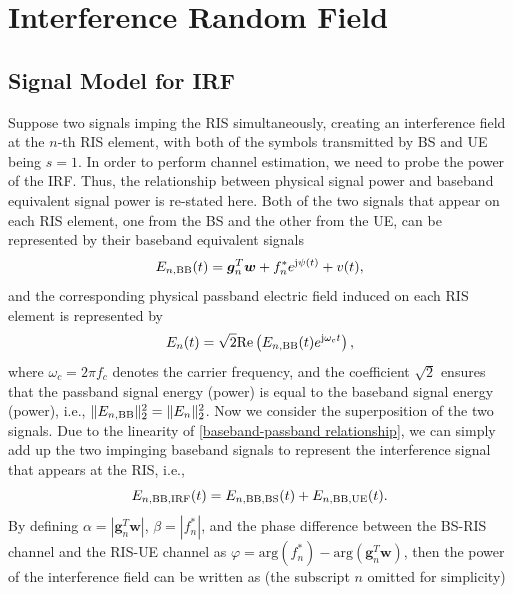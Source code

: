 \documentclass[12pt,draftclsnofoot,journal,onecolumn]{IEEEtran}
\theoremstyle{nonumberplain}
\def \arg {\text{arg}}
\begin{document}
\section{Interference Random Field}
\label{Interference Random Field}

\subsection{Signal Model for IRF}
\label{Models for IRFs}
    Suppose two signals imping the RIS simultaneously, creating an interference field \cite{louradour1993interference} at the $n$-th RIS element, with both of the symbols transmitted by \ac{BS} and \ac{UE} being $s=1$. In order to perform channel estimation, we need to probe the power of the \ac{IRF}. Thus, the relationship between physical signal power and baseband equivalent signal power is re-stated here. Both of the two signals that appear on each RIS element, one from the \ac{BS} and the other from the \ac{UE}, can be represented by their baseband equivalent signals
    \begin{equation}
    \label{interference}
    E_{n,{\rm BB}}(t)=\bm g_{n}^{T}\bm w+f_{n}^{*}e^{{\rm j}\psi (t)}+v(t),
    \end{equation}
    and the corresponding physical passband electric field induced on each RIS element is represented by 
    \begin{equation}
        E_{n}(t) = \sqrt{2} {\rm Re}\left( E_{n,{\rm BB}}(t)e^{{\rm j}\omega_c t} \right),
        \label{baseband-passband relationship}
    \end{equation}
    where $\omega_c = 2\pi f_c$ denotes the carrier frequency, and the coefficient $\sqrt{2}$ ensures that the passband signal energy (power) is equal to the baseband signal energy (power), i.e., 
    $\lVert E_{n, {\rm BB}}\rVert_2^2 = \lVert E_{n}\rVert_2^2$. 
    Now we consider the superposition of the two signals. Due to the linearity of \eqref{baseband-passband relationship}, we can simply add up the two impinging baseband signals to represent the interference signal that appears at the RIS, i.e., 
    \begin{equation}
        E_{n,{\rm BB, IRF}}(t) = E_{n, {\rm BB, BS}}(t)+E_{n,{\rm BB, UE}}(t).
    \end{equation}
    By defining $\alpha = \left\vert\bm g_{n}^{T}\bm w\right\vert$, $\beta = \left\vert f_{n}^{*}\right \vert$, and the phase difference between the \ac{BS}-\ac{RIS} channel and the \ac{RIS}-\ac{UE} channel as $\varphi = \arg\left(f_{n}^{*}\right)-\arg\left(\bm g_{n}^{T}\bm w\right)$, then the power of the interference field can be written as (the subscript $n$ omitted for simplicity)
\end{document}
